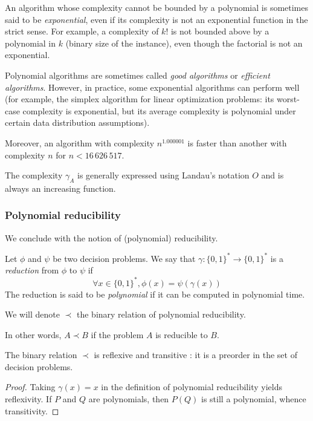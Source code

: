 An algorithm whose complexity cannot be bounded by a polynomial is sometimes said to be \textit{exponential}, even if its complexity is not an exponential function in the strict sense. For example, a complexity of $k!$ is not bounded above by a polynomial in $k$ (binary size of the instance), even though the factorial is not an exponential.

Polynomial algorithms are sometimes called \textit{good algorithms} or \textit{efficient algorithms}. However, in practice, some exponential algorithms can perform well (for example, the simplex algorithm for linear optimization problems: its worst-case complexity is exponential, but its average complexity is polynomial under certain data distribution assumptions).

Moreover, an algorithm with complexity $n^{1.000001}$ is faster than another with complexity $n$ for $n < 16\,626\,517$.

The complexity $\gamma_A$ is generally expressed using Landau's notation $O$ and is always an increasing function.

\subsubsection{Polynomial reducibility}

We conclude with the notion of (polynomial) reducibility. 

\begin{definition}
    Let $ \phi $ and $ \psi $ be two decision problems. We say that $ \gamma : \{0,1\}^* \to \{0,1\}^* $ is a \textit{reduction} from $ \phi $ to $ \psi $ if 
    \[ 
        \forall x \in \{0,1\}^*, \phi(x) = \psi(\gamma(x))
    \]
    The reduction is said to be \textit{polynomial} if it can be computed in polynomial time.
\end{definition}

\begin{definition}
    We will denote $ \prec $ the binary relation of polynomial reducibility.
\end{definition}

In other words, $ A \prec B $ if the problem $ A $ is reducible to $ B $.

\begin{proposition}
    The binary relation $ \prec $ is reflexive and transitive : it is a preorder in the set of decision problems.
\end{proposition}

\begin{proof}
    Taking $ \gamma (x) = x $ in the definition of polynomial reducibility yields reflexivity. If $ P $ and $ Q $ are polynomials, then $ P(Q) $ is still a polynomial, whence transitivity.
\end{proof}


